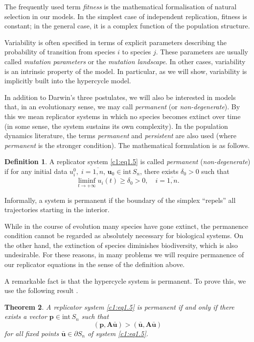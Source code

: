 \documentclass[12pt]{report}
\newcommand{\inside}{\mathrm{int}\,}
\newcommand{\bound}{\partial}
\newtheorem{theorem}{Theorem}[section]
\theoremstyle{definition}
\newtheorem{definition}[theorem]{Definition}
\theoremstyle{remark}
\begin{document}
The frequently used term \emph{fitness} is the mathematical
formalisation of natural selection in our models.  In the simplest
case of independent replication, fitness is constant; in the general
case, it is a complex function of the population structure.

Variability is often specified in terms of explicit parameters
describing the probability of transition from species $i$ to species $j$.
These parameters are usually called \emph{mutation parameters} or
the \emph{mutation landscape}.  In other cases, variability is an intrinsic property of the
model.  In particular, as we will show, variability is implicitly
built into the hypercycle model.

In addition to Darwin's three postulates, we will also be interested
in models that, in an evolutionary sense, we may call
\emph{permanent} (or \emph{non-degenerate}).  By this we mean
replicator systems in which no species becomes extinct over time
(in some sense, the system sustains its own complexity).
In the population dynamics literature, the terms \textit{permanent} and
\textit{persistent} are also used \cite{c1:Hofbauer1978} (where \textit{permanent} is the stronger condition). 
The mathematical formulation is as follows.

\begin{definition}\label{c1:def1.1}
A replicator system \eqref{c1:eq1.5} is called \emph{permanent}
(\emph{non-degenerate}) if for any initial data
$u_{i}^{0},\;i=\overline{1,n}$,
$\mathbf{u}_{0}\in\inside S_{n}$, there exists $\delta_{0}>0$ such that
\[
  \liminf_{t\to+\infty}u_{i}(t)\geqslant\delta_{0}>0,\quad
  i=\overline{1,n}.
\]

\end{definition}

Informally, a system is permanent if the boundary of the simplex
``repels'' all trajectories starting in the interior.

While in the course of evolution many species have gone extinct, the
permanence condition cannot be regarded as absolutely necessary for
biological systems.  On the other hand, the extinction of species
diminishes biodiversity, which is also undesirable.  For these
reasons, in many problems we will require permanence of our
replicator equations in the sense of the definition above.

A remarkable fact is that the hypercycle system is permanent.
To prove this, we use the following result \cite{c1:Hofbauer2003}.

\begin{theorem}\label{c1:t1.1}
A replicator system \eqref{c1:eq1.5} is permanent if and only if there
exists a vector $\mathbf{p}\in\inside S_{n}$ such that
\[
  (\mathbf{p},\mathbf{A}\bar{\mathbf{u}})
  >(\bar{\mathbf{u}},\mathbf{A}\bar{\mathbf{u}})
\]
for all fixed points $\bar{\mathbf{u}}\in\bound S_{n}$
of system \eqref{c1:eq1.5}.
\end{theorem}
\end{document}
